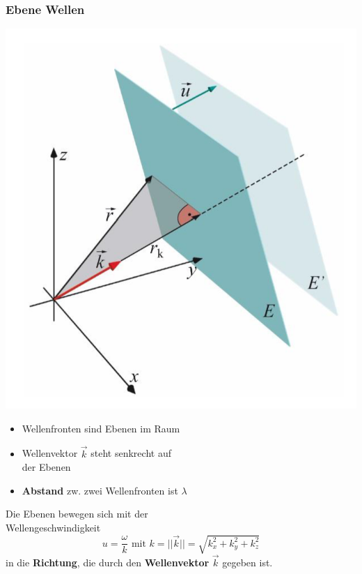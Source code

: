 \subsubsection{Ebene Wellen}

\begin{minipage}{0.3\linewidth}
\includegraphics[width=0.98\linewidth]{Bilder/Wellen-Optik/Ebene_Welle}
\end{minipage}
\hfill
\begin{minipage}{0.68\linewidth}

\begin{itemize}
	\item Wellenfronten sind Ebenen im Raum 
	\item Wellenvektor $\vec{k}$ steht senkrecht auf \\
		der Ebenen 
	\item \textbf{Abstand} zw. zwei Wellenfronten ist $\lambda$ 

\end{itemize}


Die Ebenen bewegen sich mit der \\
Wellengeschwindigkeit
$$ \boxed{ u = \frac{\omega}{k} \text{ mit } k = ||\vec{k}|| = \sqrt{k_x^2 + k_y^2 + k_z^2} }$$  in die \textbf{Richtung}, die durch den \textbf{Wellenvektor} $\vec{k}$ gegeben ist.
\end{minipage}





